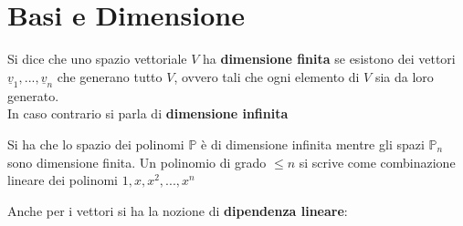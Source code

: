 \documentclass[a4paper,12pt, oneside]{book}
\begin{document}
\section{Basi e Dimensione}
\begin{definizione}
	Si dice che uno spazio vettoriale $V$ ha \textbf{dimensione finita} se esistono dei vettori $\underline{v}_1,...,\underline{v}_n$ che generano tutto $V$, ovvero tali che ogni elemento di $V$ sia da loro generato.\\
	In caso contrario si parla di \textbf{dimensione infinita}
\end{definizione}
\begin{nota}
	Si ha che lo spazio dei polinomi $\mathbb{P}$ è di dimensione infinita mentre gli spazi $\mathbb{P}_n$ sono dimensione finita. Un polinomio di grado $\leq n$ si scrive come combinazione lineare dei polinomi $1,x,x^2,...,x^n$
\end{nota}
Anche per i vettori si ha la nozione di \textbf{dipendenza lineare}:
\end{document}
